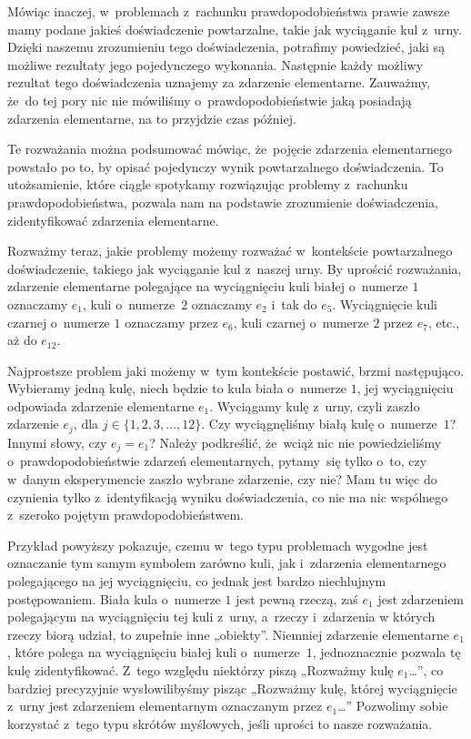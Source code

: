 \documentclass[a4paper,11pt]{article}
\numberwithin{equation}{section}
\begin{document}
Mówiąc inaczej, w~problemach z~rachunku prawdopodobieństwa prawie zawsze
mamy podane jakieś doświadczenie powtarzalne, takie jak wyciąganie kul
z~urny. Dzięki naszemu zrozumieniu tego doświadczenia, potrafimy powiedzieć,
jaki są możliwe rezultaty jego pojedynczego wykonania. Następnie każdy
możliwy rezultat tego doświadczenia uznajemy za zdarzenie elementarne.
Zauważmy, że~do tej pory nic nie mówiliśmy o~prawdopodobieństwie jaką
posiadają zdarzenia elementarne, na to przyjdzie czas później.

Te rozważania można podsumować mówiąc, że~pojęcie zdarzenia elementarnego
powstało po to, by opisać pojedynczy wynik powtarzalnego doświadczenia.
To utożsamienie, które ciągle spotykamy rozwiązując problemy z~rachunku
prawdopodobieństwa, pozwala nam na podstawie zrozumienie doświadczenia,
zidentyfikować zdarzenia elementarne.

Rozważmy teraz, jakie problemy możemy rozważać w~kontekście powtarzalnego
doświadczenie, takiego jak wyciąganie kul z~naszej urny. By uprościć
rozważania, zdarzenie elementarne
polegające na wyciągnięciu kuli białej o~numerze $1$ oznaczamy $e_{ 1 }$,
kuli o~numerze~$2$ oznaczamy $e_{ 2 }$ i~tak do $e_{ 5 }$. Wyciągnięcie kuli
czarnej o~numerze $1$ oznaczamy przez $e_{ 6 }$, kuli czarnej o~numerze $2$
przez $e_{ 7 }$, etc., aż do $e_{ 12 }$.

Najprostsze problem jaki możemy w~tym kontekście postawić, brzmi następująco.
Wybieramy jedną kulę, niech będzie to kula biała o~numerze $1$,
jej wyciągnięciu odpowiada zdarzenie elementarne $e_{ 1 }$. Wyciągamy kulę
z~urny, czyli zaszło zdarzenie $e_{ j }$, dla $j \in \{ 1, 2, 3, \ldots, 12 \}$. Czy
wyciągnęliśmy białą kulę o~numerze~$1$? Innymi słowy, czy
$e_{ j } = e_{ 1 }$? Należy podkreślić, że~wciąż nic nie powiedzieliśmy
o~prawdopodobieństwie zdarzeń elementarnych, pytamy~się tylko o~to, czy
w~danym eksperymencie zaszło wybrane zdarzenie, czy nie? Mam tu więc do
czynienia tylko z~identyfikacją wyniku doświadczenia, co nie ma nic wspólnego
z~szeroko pojętym prawdopodobieństwem.

Przykład powyższy pokazuje, czemu w~tego typu problemach wygodne jest
oznaczanie tym samym symbolem zarówno kuli, jak i~zdarzenia elementarnego
polegającego na jej wyciągnięciu, co jednak jest bardzo niechlujnym
postępowaniem. Biała kula o~numerze $1$ jest pewną rzeczą, zaś $e_{ 1 }$ jest
zdarzeniem polegającym na wyciągnięciu tej kuli z~urny, a~rzeczy i~zdarzenia
w których rzeczy biorą udział, to zupełnie inne „obiekty”. Niemniej zdarzenie
elementarne $e_{ 1 }$, które polega na wyciągnięciu białej kuli
o~numerze~$1$, jednoznacznie pozwala tę kulę zidentyfikować. Z~tego względu
niektórzy piszą „Rozważmy kulę $e_{ 1 }$\ldots”, co bardziej precyzyjnie
wysłowilibyśmy pisząc „Rozważmy kulę, której wyciągnięcie z~urny jest
zdarzeniem elementarnym oznaczanym przez $e_{ 1 }$\ldots” Pozwolimy sobie
korzystać z~tego typu skrótów myślowych, jeśli uprości to nasze rozważania.
\end{document}
